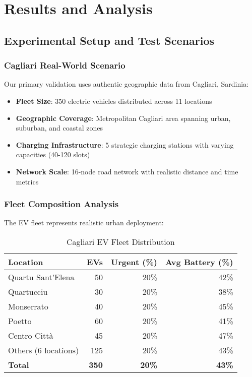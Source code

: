 \documentclass[12pt,a4paper]{article}
\begin{document}
\section{Results and Analysis}

\subsection{Experimental Setup and Test Scenarios}

\subsubsection{Cagliari Real-World Scenario}
Our primary validation uses authentic geographic data from Cagliari, Sardinia:

\begin{itemize}
    \item \textbf{Fleet Size}: 350 electric vehicles distributed across 11 locations
    \item \textbf{Geographic Coverage}: Metropolitan Cagliari area spanning urban, suburban, and coastal zones
    \item \textbf{Charging Infrastructure}: 5 strategic charging stations with varying capacities (40-120 slots)
    \item \textbf{Network Scale}: 16-node road network with realistic distance and time metrics
\end{itemize}

\subsubsection{Fleet Composition Analysis}
The EV fleet represents realistic urban deployment:

\begin{table}[h]
\centering
\caption{Cagliari EV Fleet Distribution}
\begin{tabular}{@{}lrrr@{}}
\toprule
Location & EVs & Urgent (\%) & Avg Battery (\%) \\
\midrule
Quartu Sant'Elena & 50 & 20\% & 42\% \\
Quartucciu & 30 & 20\% & 38\% \\
Monserrato & 40 & 20\% & 45\% \\
Poetto & 60 & 20\% & 41\% \\
Centro Città & 45 & 20\% & 47\% \\
Others (6 locations) & 125 & 20\% & 43\% \\
\midrule
\textbf{Total} & \textbf{350} & \textbf{20\%} & \textbf{43\%} \\
\bottomrule
\end{tabular}
\end{table}
\end{document}
